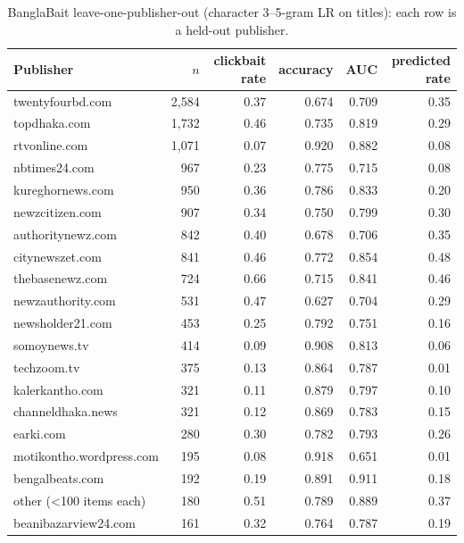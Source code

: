\begin{table}[h]
\centering
\caption{BanglaBait leave-one-publisher-out (character 3--5-gram LR on titles): each row is a held-out publisher.}\label{tab:supp-loso}
\small
\begin{tabular}{@{}lrrrrr@{}}
\toprule
Publisher & $n$ & clickbait rate & accuracy & AUC & predicted rate \\
\midrule
twentyfourbd.com & 2{,}584 & 0.37 & 0.674 & 0.709 & 0.35 \\
topdhaka.com & 1{,}732 & 0.46 & 0.735 & 0.819 & 0.29 \\
rtvonline.com & 1{,}071 & 0.07 & 0.920 & 0.882 & 0.08 \\
nbtimes24.com & 967 & 0.23 & 0.775 & 0.715 & 0.08 \\
kureghornews.com & 950 & 0.36 & 0.786 & 0.833 & 0.20 \\
newzcitizen.com & 907 & 0.34 & 0.750 & 0.799 & 0.30 \\
authoritynewz.com & 842 & 0.40 & 0.678 & 0.706 & 0.35 \\
citynewszet.com & 841 & 0.46 & 0.772 & 0.854 & 0.48 \\
thebasenewz.com & 724 & 0.66 & 0.715 & 0.841 & 0.46 \\
newzauthority.com & 531 & 0.47 & 0.627 & 0.704 & 0.29 \\
newsholder21.com & 453 & 0.25 & 0.792 & 0.751 & 0.16 \\
somoynews.tv & 414 & 0.09 & 0.908 & 0.813 & 0.06 \\
techzoom.tv & 375 & 0.13 & 0.864 & 0.787 & 0.01 \\
kalerkantho.com & 321 & 0.11 & 0.879 & 0.797 & 0.10 \\
channeldhaka.news & 321 & 0.12 & 0.869 & 0.783 & 0.15 \\
earki.com & 280 & 0.30 & 0.782 & 0.793 & 0.26 \\
motikontho.wordpress.com & 195 & 0.08 & 0.918 & 0.651 & 0.01 \\
bengalbeats.com & 192 & 0.19 & 0.891 & 0.911 & 0.18 \\
other (<100 items each) & 180 & 0.51 & 0.789 & 0.889 & 0.37 \\
beanibazarview24.com & 161 & 0.32 & 0.764 & 0.787 & 0.19 \\
\bottomrule
\end{tabular}
\end{table}
